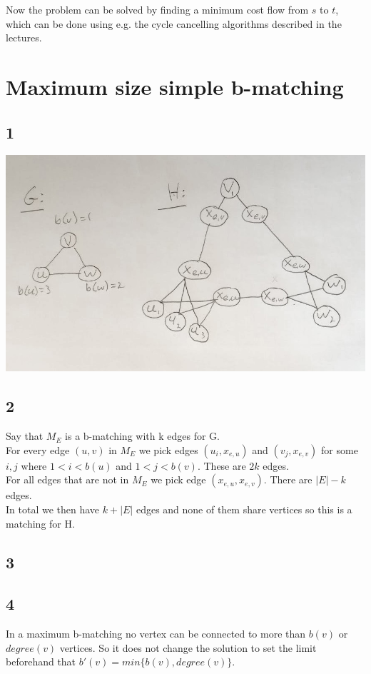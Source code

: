 \documentclass[a4paper]{article}
\begin{document}
Now the problem can be solved by finding a minimum cost flow from $s$ to $t$, which can be done using e.g. the cycle cancelling algorithms described in the lectures.
\section{Maximum size simple b-matching}
\subsection*{1}
\includegraphics[width=\textwidth]{5}
\subsection*{2}
Say that $M_E$ is a b-matching with k edges for G. \\
For every edge $(u,v)$ in $M_E$ we pick edges $(u_i,x_{e,u})$ and $(v_j,x_{e,v})$ for some $i,j$ where $1<i<b(u)$ and $1<j<b(v)$. These are $2k$ edges.\\
For all edges that are not in $M_E$ we pick edge $(x_{e,u},x_{e,v})$. There are $|E| - k$ edges.\\
In total we then have $k+|E|$ edges and none of them share vertices so this is a matching for H.
\subsection*{3}

\subsection*{4}
In a maximum b-matching no vertex can be connected to more than $b(v)$ or $degree(v)$ vertices. So it does not change the solution to set the limit beforehand that $b'(v)=min\{b(v),degree(v)\}$.
\end{document}
